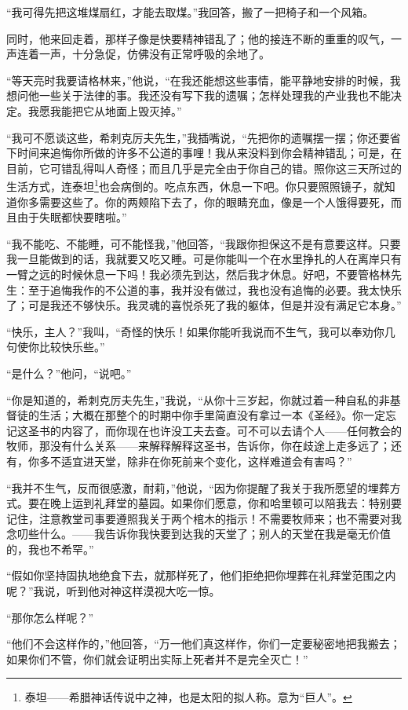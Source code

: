 \par “我可得先把这堆煤扇红，才能去取煤。”我回答，搬了一把椅子和一个风箱。
\par 同时，他来回走着，那样子像是快要精神错乱了；他的接连不断的重重的叹气，一声连着一声，十分急促，仿佛没有正常呼吸的余地了。
\par “等天亮时我要请格林来，”他说，“在我还能想这些事情，能平静地安排的时候，我想问他一些关于法律的事。我还没有写下我的遗嘱；怎样处理我的产业我也不能决定。我愿我能把它从地面上毁灭掉。”
\par “我可不愿谈这些，希刺克厉夫先生，”我插嘴说，“先把你的遗嘱摆一摆；你还要省下时间来追悔你所做的许多不公道的事哩！我从来没料到你会精神错乱；可是，在目前，它可错乱得叫人奇怪；而且几乎是完全由于你自己的错。照你这三天所过的生活方式，连泰坦\footnote{泰坦——希腊神话传说中之神，也是太阳的拟人称。意为“巨人”。}也会病倒的。吃点东西，休息一下吧。你只要照照镜子，就知道你多需要这些了。你的两颊陷下去了，你的眼睛充血，像是一个人饿得要死，而且由于失眠都快要瞎啦。”
\par “我不能吃、不能睡，可不能怪我，”他回答，“我跟你担保这不是有意要这样。只要我一旦能做到的话，我就要又吃又睡。可是你能叫一个在水里挣扎的人在离岸只有一臂之远的时候休息一下吗！我必须先到达，然后我才休息。好吧，不要管格林先生：至于追悔我作的不公道的事，我并没有做过，我也没有追悔的必要。我太快乐了；可是我还不够快乐。我灵魂的喜悦杀死了我的躯体，但是并没有满足它本身。”
\par “快乐，主人？”我叫，“奇怪的快乐！如果你能听我说而不生气，我可以奉劝你几句使你比较快乐些。”
\par “是什么？”他问，“说吧。”
\par “你是知道的，希刺克厉夫先生，”我说，“从你十三岁起，你就过着一种自私的非基督徒的生活；大概在那整个的时期中你手里简直没有拿过一本《圣经》。你一定忘记这圣书的内容了，而你现在也许没工夫去查。可不可以去请个人——任何教会的牧师，那没有什么关系——来解释解释这圣书，告诉你，你在歧途上走多远了；还有，你多不适宜进天堂，除非在你死前来个变化，这样难道会有害吗？”
\par “我并不生气，反而很感激，耐莉，”他说，“因为你提醒了我关于我所愿望的埋葬方式。要在晚上运到礼拜堂的墓园。如果你们愿意，你和哈里顿可以陪我去：特别要记住，注意教堂司事要遵照我关于两个棺木的指示！不需要牧师来；也不需要对我念叨些什么。——我告诉你我快要到达我的天堂了；别人的天堂在我是毫无价值的，我也不希罕。”
\par “假如你坚持固执地绝食下去，就那样死了，他们拒绝把你埋葬在礼拜堂范围之内呢？”我说，听到他对神这样漠视大吃一惊。
\par “那你怎么样呢？”
\par “他们不会这样作的，”他回答，“万一他们真这样作，你们一定要秘密地把我搬去；如果你们不管，你们就会证明出实际上死者并不是完全灭亡！”
